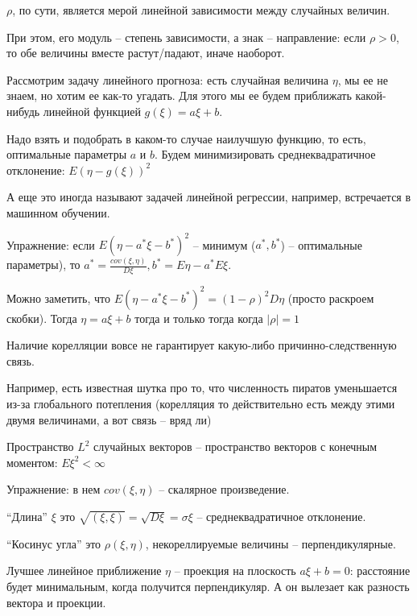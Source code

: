 \begin{Rem}
    $\rho$, по сути, является мерой линейной зависимости между случайных величин. 

    При этом, его модуль -- степень зависимости, а знак -- направление: если $\rho > 0$, то обе величины вместе растут/падают, иначе наоборот.
\end{Rem}

Рассмотрим задачу линейного прогноза: есть случайная величина $\eta$, мы ее не знаем, но хотим ее как-то угадать.
Для этого мы ее будем приближать какой-нибудь линейной функцией $g(\xi) = a\xi + b$. 

Надо взять и подобрать в каком-то случае наилучшую функцию, то есть, оптимальные параметры $a$ и $b$. 
Будем минимизировать среднеквадратичное отклонение: $E(\eta - g(\xi))^2$
\begin{Rem}
А еще это иногда называют задачей линейной регрессии, например, встречается в машинном обучении.
\end{Rem}

Упражнение: если $E(\eta - a^*\xi -b^*)^2$ -- минимум ($a^*, b^*$) -- оптимальные параметры), то $a^* = \frac{cov(\xi, \eta)}{D\xi}, b^* = E\eta - a^*E\xi$.

Можно заметить, что $E(\eta - a^*\xi -b^*)^2 = (1 - \rho)^2 D\eta$ (просто раскроем скобки). Тогда $\eta =  a\xi + b$ тогда и только тогда когда $|\rho| = 1$

\begin{Rem}
Наличие корелляции вовсе не гарантирует какую-либо причинно-следственную связь. 

Например, есть известная шутка про то, что численность пиратов уменьшается из-за глобального потепления (корелляция то действительно есть между этими двумя величинами, а вот связь -- вряд ли) 
\end{Rem}

\begin{Def}
Пространство $L^2$ случайных векторов -- пространство векторов с конечным моментом: $E \xi^2 < \infty$
\end{Def}

Упражнение: в нем $cov(\xi, \eta)$ -- скалярное произведение.

``Длина'' $\xi$ это $\sqrt{(\xi, \xi)} = \sqrt{D\xi} = \sigma \xi$ -- среднеквадратичное отклонение.

``Косинус угла'' это $\rho(\xi, \eta)$, некореллируемые величины -- перпендикулярные.

Лучшее линейное приближение $\eta$ -- проекция на плоскость $a\xi + b = 0$: расстояние будет минимальным, когда получится перпендикуляр.
А он вылезает как разность вектора и проекции. 


